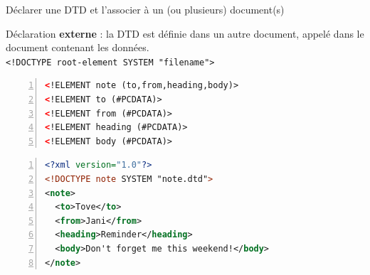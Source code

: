 \begin{frame}[containsverbatim]{Déclarer une DTD et l'associer à un (ou plusieurs) document(s)}

Déclaration \textbf{externe} : 
la DTD est définie dans un autre document, appelé dans le document contenant les données.\\
\verb?<!DOCTYPE root-element SYSTEM "filename">?

\begin{lstlisting}[basicstyle=\footnotesize, language=XML,breaklines=true,numbers=left, caption={DTD contenue dans le fichier note.dtd}]
<!ELEMENT note (to,from,heading,body)>
<!ELEMENT to (#PCDATA)>
<!ELEMENT from (#PCDATA)>
<!ELEMENT heading (#PCDATA)>
<!ELEMENT body (#PCDATA)>
\end{lstlisting}

\begin{lstlisting}[basicstyle=\footnotesize, language=XML,breaklines=true,numbers=left, caption={Déclaration externe, fichier appelant la DTD ci-dessus}]
<?xml version="1.0"?>
<!DOCTYPE note SYSTEM "note.dtd">
<note>
  <to>Tove</to>
  <from>Jani</from>
  <heading>Reminder</heading>
  <body>Don't forget me this weekend!</body>
</note>
\end{lstlisting}


\end{frame}


